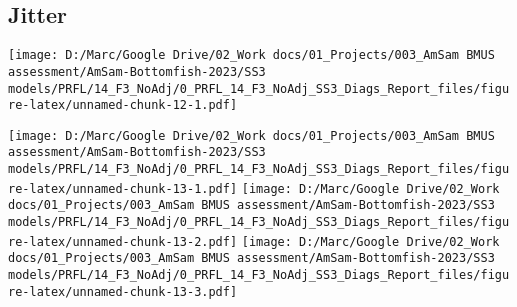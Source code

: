\documentclass[
]{article}
\begin{document}
\hypertarget{jitter}{%
\subsection{Jitter}\label{jitter}}

\texttt{[image: D:/Marc/Google Drive/02\_Work docs/01\_Projects/003\_AmSam BMUS assessment/AmSam-Bottomfish-2023/SS3 models/PRFL/14\_F3\_NoAdj/0\_PRFL\_14\_F3\_NoAdj\_SS3\_Diags\_Report\_files/figure-latex/unnamed-chunk-12-1.pdf]}

\texttt{[image: D:/Marc/Google Drive/02\_Work docs/01\_Projects/003\_AmSam BMUS assessment/AmSam-Bottomfish-2023/SS3 models/PRFL/14\_F3\_NoAdj/0\_PRFL\_14\_F3\_NoAdj\_SS3\_Diags\_Report\_files/figure-latex/unnamed-chunk-13-1.pdf]}
\texttt{[image: D:/Marc/Google Drive/02\_Work docs/01\_Projects/003\_AmSam BMUS assessment/AmSam-Bottomfish-2023/SS3 models/PRFL/14\_F3\_NoAdj/0\_PRFL\_14\_F3\_NoAdj\_SS3\_Diags\_Report\_files/figure-latex/unnamed-chunk-13-2.pdf]}
\texttt{[image: D:/Marc/Google Drive/02\_Work docs/01\_Projects/003\_AmSam BMUS assessment/AmSam-Bottomfish-2023/SS3 models/PRFL/14\_F3\_NoAdj/0\_PRFL\_14\_F3\_NoAdj\_SS3\_Diags\_Report\_files/figure-latex/unnamed-chunk-13-3.pdf]}

\hypertarget{section}{%
\subsection{}\label{section}}
\end{document}
